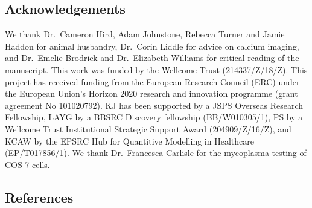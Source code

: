 \documentclass[
  11pt,
  letterpaper,
  DIV=11,
  numbers=noendperiod]{scrartcl}
\begin{document}
\subsection{Acknowledgements}\label{acknowledgements}

We thank Dr.~Cameron Hird, Adam Johnstone, Rebecca Turner and Jamie
Haddon for animal husbandry, Dr.~Corin Liddle for advice on calcium
imaging, and Dr.~Emelie Brodrick and Dr.~Elizabeth Williams for critical
reading of the manuscript. This work was funded by the Wellcome Trust
(214337/Z/18/Z). This project has received funding from the European
Research Council (ERC) under the European Union's Horizon 2020 research
and innovation programme (grant agreement No 101020792). KJ has been
supported by a JSPS Overseas Research Fellowship, LAYG by a BBSRC
Discovery fellowship (BB/W010305/1), PS by a Wellcome Trust
Institutional Strategic Support Award (204909/Z/16/Z), and KCAW by the
EPSRC Hub for Quantitive Modelling in Healthcare (EP/T017856/1). We
thank Dr.~Francesca Carlisle for the mycoplasma testing of COS-7 cells.

\subsection*{References}\label{references}
\end{document}
